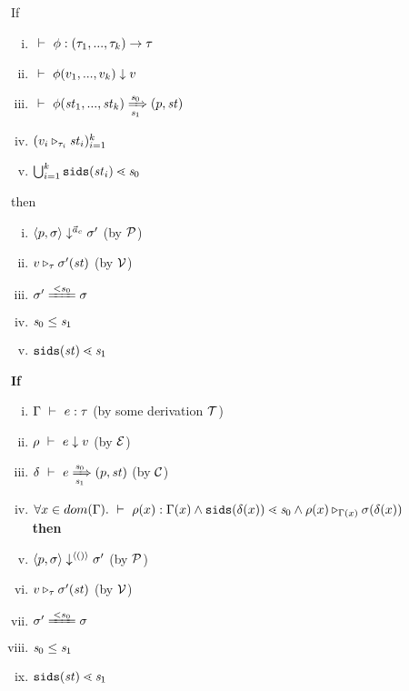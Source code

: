 \begin{lem}
	\label{function-correctness}
	If 
	\begin{enumerate}[(i)]
	\item $\Type{} {\TypeF} {\Tupk{\tau} \-> \tau}$
	\item $\Eval{}{\EvalF{\Tupk{v}}}{v}$
	\item $\tranf{\st_1}{\st_k}{\s_0}{\s_1}{\sfun{p}{\st}}$
 	\item $(\ValRep{v_i}{\tau_i}{\st_i})^k_{i=1}$
 	\item $\bigcup^k_{i=1}\sids{\st_i} \SetLe \s_0$
	\end{enumerate}
 	then 
 	\begin{enumerate}[(i)]
 		\item $\seval{p}{\sgm}{\a_c}{\sgm'}$ (by $\MP$)
 		\item $\ValRep{v}{\tau}{\sgm'(\st)}$ (by $\MV$)
 		\item $\sgm' \ConEq{s_0} \sgm $
 	    \item $\s_0 \le \s_1$
 		\item $\sids{\st} \SetLe \s_1$

 	\end{enumerate}
\end{lem}


\begin{thm}
	\label{main-correctness}
	\textbf{If} 
	\begin{enumerate}[(i)]
		\item $\Type{\Gam}{e}{\tau}$ (by some derivation $\MT$)
		\item $\Eval{\rho}{e}{v}$ (by $\ME$) 
		\item $\Trans{\del}{e}{\s_0}{\s_1}{\sfun{p}{\st}}$ (by $\MC$)
		\item $\forall x \in dom(\Gam). \Type{}{\rho(x)}{\Gam(x) } \wedge \sids{\del(x)} \SetLe \s_0  \wedge  \ValRep{\rho(x)}{\Gam(x)}{\sgm(\del(x))}$ \\
	\textbf{then} 
		\item $\seval{p}{\sgm}{\singl{()}}{\sgm'}$ (by $\MP$)
		\item  $\ValRep{v}{\tau}{\sgm'(\st)}$ (by $\MV$)
		\item $\sgm' \ConEq{s_0} \sgm $
	    \item $\s_0 \le \s_1$
		\item  $\sids{\st} \SetLe \s_1$
	\end{enumerate} 
\end{thm}

